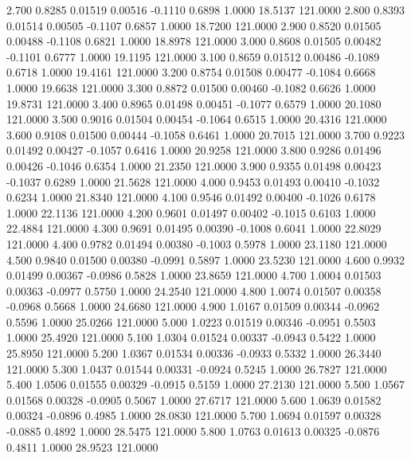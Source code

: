    2.700   0.8285   0.01519   0.00516  -0.1110   0.6898   1.0000  18.5137 121.0000
   2.800   0.8393   0.01514   0.00505  -0.1107   0.6857   1.0000  18.7200 121.0000
   2.900   0.8520   0.01505   0.00488  -0.1108   0.6821   1.0000  18.8978 121.0000
   3.000   0.8608   0.01505   0.00482  -0.1101   0.6777   1.0000  19.1195 121.0000
   3.100   0.8659   0.01512   0.00486  -0.1089   0.6718   1.0000  19.4161 121.0000
   3.200   0.8754   0.01508   0.00477  -0.1084   0.6668   1.0000  19.6638 121.0000
   3.300   0.8872   0.01500   0.00460  -0.1082   0.6626   1.0000  19.8731 121.0000
   3.400   0.8965   0.01498   0.00451  -0.1077   0.6579   1.0000  20.1080 121.0000
   3.500   0.9016   0.01504   0.00454  -0.1064   0.6515   1.0000  20.4316 121.0000
   3.600   0.9108   0.01500   0.00444  -0.1058   0.6461   1.0000  20.7015 121.0000
   3.700   0.9223   0.01492   0.00427  -0.1057   0.6416   1.0000  20.9258 121.0000
   3.800   0.9286   0.01496   0.00426  -0.1046   0.6354   1.0000  21.2350 121.0000
   3.900   0.9355   0.01498   0.00423  -0.1037   0.6289   1.0000  21.5628 121.0000
   4.000   0.9453   0.01493   0.00410  -0.1032   0.6234   1.0000  21.8340 121.0000
   4.100   0.9546   0.01492   0.00400  -0.1026   0.6178   1.0000  22.1136 121.0000
   4.200   0.9601   0.01497   0.00402  -0.1015   0.6103   1.0000  22.4884 121.0000
   4.300   0.9691   0.01495   0.00390  -0.1008   0.6041   1.0000  22.8029 121.0000
   4.400   0.9782   0.01494   0.00380  -0.1003   0.5978   1.0000  23.1180 121.0000
   4.500   0.9840   0.01500   0.00380  -0.0991   0.5897   1.0000  23.5230 121.0000
   4.600   0.9932   0.01499   0.00367  -0.0986   0.5828   1.0000  23.8659 121.0000
   4.700   1.0004   0.01503   0.00363  -0.0977   0.5750   1.0000  24.2540 121.0000
   4.800   1.0074   0.01507   0.00358  -0.0968   0.5668   1.0000  24.6680 121.0000
   4.900   1.0167   0.01509   0.00344  -0.0962   0.5596   1.0000  25.0266 121.0000
   5.000   1.0223   0.01519   0.00346  -0.0951   0.5503   1.0000  25.4920 121.0000
   5.100   1.0304   0.01524   0.00337  -0.0943   0.5422   1.0000  25.8950 121.0000
   5.200   1.0367   0.01534   0.00336  -0.0933   0.5332   1.0000  26.3440 121.0000
   5.300   1.0437   0.01544   0.00331  -0.0924   0.5245   1.0000  26.7827 121.0000
   5.400   1.0506   0.01555   0.00329  -0.0915   0.5159   1.0000  27.2130 121.0000
   5.500   1.0567   0.01568   0.00328  -0.0905   0.5067   1.0000  27.6717 121.0000
   5.600   1.0639   0.01582   0.00324  -0.0896   0.4985   1.0000  28.0830 121.0000
   5.700   1.0694   0.01597   0.00328  -0.0885   0.4892   1.0000  28.5475 121.0000
   5.800   1.0763   0.01613   0.00325  -0.0876   0.4811   1.0000  28.9523 121.0000

